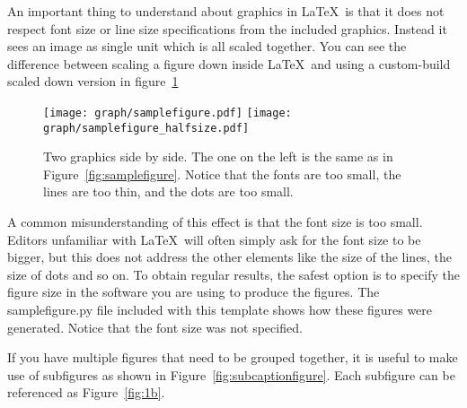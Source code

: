 \documentclass[a4paper,12pt]{article}
\begin{document}
An important thing to understand about graphics in \LaTeX\ is that it does
not respect font size or line size specifications from the included graphics.
Instead it sees an image as single unit which is all scaled together. You can
see the difference between scaling a figure down inside \LaTeX\ and using a
custom-build scaled down version in figure~\ref{fig:scalingexample}

\begin{figure}[htbp]
  \centering
  \texttt{[image: graph/samplefigure.pdf]}
  \texttt{[image: graph/samplefigure\_halfsize.pdf]}
  \caption{Two graphics side by side. The one on the left is the same as
    in Figure~\ref{fig:samplefigure}. Notice that the fonts are too small,
    the lines are too thin, and the dots are too small.}
  \label{fig:scalingexample}
\end{figure}

A common misunderstanding of this effect is that the font size is too small.
Editors unfamiliar with \LaTeX\ will often simply ask for the font size to be
bigger, but this does not address the other elements like the size of the lines,
the size of dots and so on. To obtain regular results, the safest option is to
specify the figure size in the software you are using to produce the figures.
The samplefigure.py file included with this template shows how these figures
were generated. Notice that the font size was not specified.

If you have multiple figures that need to be grouped together, it is useful to
make use of subfigures as shown in Figure~\ref{fig:subcaptionfigure}. Each
subfigure can be referenced as Figure~\ref{fig:1b}.
\end{document}
